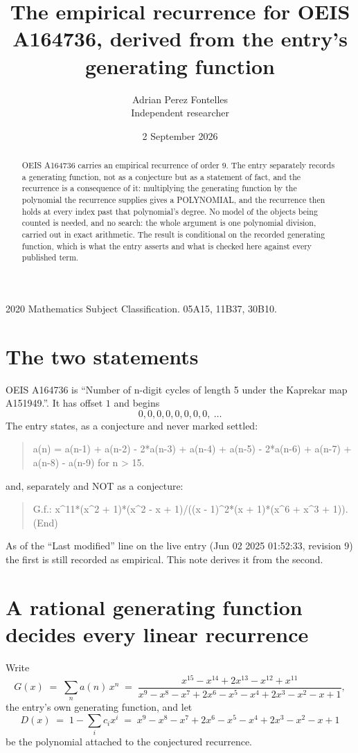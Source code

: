 \documentclass[11pt,a4paper]{article}
\title{The empirical recurrence for OEIS A164736, derived from the entry's generating function}
\author{Adrian Perez Fontelles\\ \small Independent researcher}
\date{2 September 2026}
\theoremstyle{plain}
\theoremstyle{definition}
\begin{document}
\maketitle

\begin{abstract}
OEIS A164736 carries an empirical recurrence of order $9$. The entry separately records a
generating function, not as a conjecture but as a statement of fact, and the recurrence is a
consequence of it: multiplying the generating function by the polynomial the recurrence
supplies gives a POLYNOMIAL, and the recurrence then holds at every index past that
polynomial's degree. No model of the objects being counted is needed, and no search: the
whole argument is one polynomial division, carried out in exact arithmetic. The result is
conditional on the recorded generating function, which is what the entry asserts and what is
checked here against every published term.
\end{abstract}

\noindent\small 2020 Mathematics Subject Classification. 05A15, 11B37, 30B10.\normalsize

\section{The two statements}

OEIS A164736 is ``Number of n-digit cycles of length 5 under the Kaprekar map A151949.''. It has offset $1$ and begins
\[
0, 0, 0, 0, 0, 0, 0, 0,\ \dots
\]
The entry states, as a conjecture and never marked settled:
\begin{quote}
a(n) = a(n-1) + a(n-2) - 2*a(n-3) + a(n-4) + a(n-5) - 2*a(n-6) + a(n-7) + a(n-8) - a(n-9) for n > 15.
\end{quote}
and, separately and NOT as a conjecture:
\begin{quote}
G.f.: x\^{}11*(x\^{}2 + 1)*(x\^{}2 - x + 1)/((x - 1)\^{}2*(x + 1)*(x\^{}6 + x\^{}3 + 1)). (End)
\end{quote}
As of the ``Last modified'' line on the live entry (Jun 02 2025 01:52:33, revision 9) the first is still
recorded as empirical. This note derives it from the second.

\section{A rational generating function decides every linear recurrence}

Write
\[
G(x)\;=\;\sum_{n}a(n)\,x^{n}\;=\;\frac{x^{15} - x^{14} + 2 x^{13} - x^{12} + x^{11}}{x^{9} - x^{8} - x^{7} + 2 x^{6} - x^{5} - x^{4} + 2 x^{3} - x^{2} - x + 1},
\]
the entry's own generating function, and let
\[
D(x)\;=\;1-\sum_i c_i x^{i}\;=\;x^{9} - x^{8} - x^{7} + 2 x^{6} - x^{5} - x^{4} + 2 x^{3} - x^{2} - x + 1
\]
be the polynomial attached to the conjectured recurrence.
\end{document}
